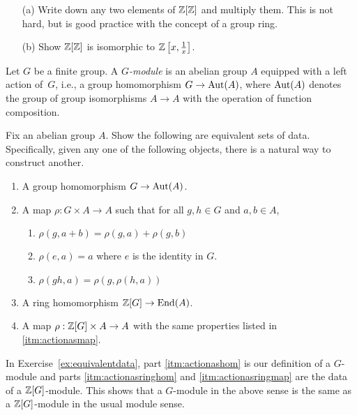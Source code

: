 \begin{exercise}
	\hfill
	\begin{enumerate}
		\item[(a)]
			Write down any two elements of $\mathbb{Z}[\mathbb{Z}]$ and multiply them.
			This is not hard, but is good practice with the concept
			of a group ring.
		\item[(b)]
			Show $\mathbb{Z}[\mathbb{Z}]$ is isomorphic to $\mathbb{Z}\left[x,\frac{1}{x}\right]$.
	\end{enumerate}
\end{exercise}

\begin{definition}
	Let $G$ be a finite group. A \emph{$G$-module} is
	an abelian group $A$ equipped with a left action of~$G$,
	i.e., a group homomorphism $G\to\operatorname{Aut}(A)$, where $\operatorname{Aut}(A)$
	denotes the group of group isomorphisms $A\to A$ with
	the operation of function composition.
\end{definition}

\begin{exercise}\label{ex:equivalentdata}
	Fix an abelian group $A$.
	Show the following are equivalent sets of data.
	Specifically, given any one of the following objects,
	there is a natural way to construct another.
	\begin{enumerate}[label=(\alph*)]
		\item\label{itm:actionashom} A group homomorphism $G\to \operatorname{Aut}(A)$.
		\item\label{itm:actionasmap}
			A map $\rho:G\times A \to A$ such that
			for all $g,h\in G$ and $a,b\in A$,
			\begin{enumerate}[label=(\roman*)]
				\item
					$\rho(g,a+b) = \rho(g,a) + \rho(g,b)$
				\item
					$\rho(e,a) = a$ where $e$ is the identity in $G$.
				\item
					$\rho(gh,a) = \rho(g,\rho(h,a))$
			\end{enumerate}
		\item\label{itm:actionasringhom}
			A ring homomorphism $\mathbb{Z}[G] \to \operatorname{End}(A)$.
		\item\label{itm:actionasringmap}
			A map $\rho:\mathbb{Z}[G]\times A \to A$ with
			the same properties listed in \ref{itm:actionasmap}.
	\end{enumerate}
\end{exercise}

\begin{remark}
	In Exercise~\ref{ex:equivalentdata}, part \ref{itm:actionashom}
	is our definition
	of a $G$-module and parts \ref{itm:actionasringhom}
	and \ref{itm:actionasringmap} are
	the data of a $\mathbb{Z}[G]$-module. This shows that a $G$-module
	in the above sense is the same as a $\mathbb{Z}[G]$-module
	in the usual module sense.
\end{remark}

